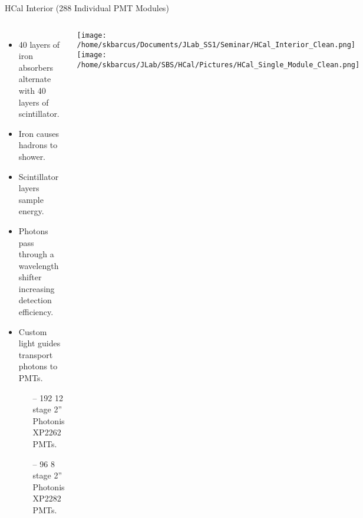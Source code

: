 \documentclass[10pt]{beamer}
\begin{document}
\begin{frame}{HCal Interior (288 Individual PMT Modules)}

    \begin{columns}[T,onlytextwidth]
  	
  	\begin{itemize}
  		\item {}\alert{40 layers of iron absorbers} alternate with \alert{40 layers of scintillator.}
		\item {}\alert{Iron causes hadrons to shower.} 
		\item {}\alert{Scintillator layers sample energy.}
		\item Photons pass through a wavelength shifter increasing detection efficiency.
		\item Custom light guides transport photons to PMTs.
			\begin{itemize}
				\item[--] 192 12 stage 2'' Photonis XP2262 PMTs.
				\item[--] 96 8 stage 2'' Photonis XP2282 PMTs.
			\end{itemize}
  	\end{itemize}

  	
  	\vspace{-5mm}
  	\begin{center}
  		\vspace{5mm}
  		\texttt{[image: /home/skbarcus/Documents/JLab\_SS1/Seminar/HCal\_Interior\_Clean.png]}
		\vspace{10mm}
  		\texttt{[image: /home/skbarcus/JLab/SBS/HCal/Pictures/HCal\_Single\_Module\_Clean.png]}
  	\end{center}
  	
	\end{columns}
	
\end{frame}
\end{document}
